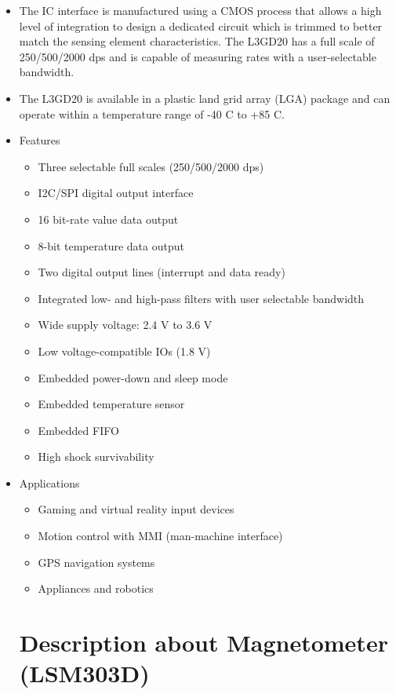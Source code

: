 \documentclass[11pt,a4paper]{article}
\begin{document}
\begin{itemize}
\item The IC interface is manufactured using a CMOS
process that allows a high level of integration to
design a dedicated circuit which is trimmed to
better match the sensing element characteristics.
The L3GD20 has a full scale of 250/500/2000
dps and is capable of measuring rates with a
user-selectable bandwidth.

\item The L3GD20 is available in a plastic land grid
array (LGA) package and can operate within a
temperature range of -40 C to +85 C.

\item Features 
\begin{itemize}
\item Three selectable full scales (250/500/2000
dps)
\item I2C/SPI digital output interface
\item 16 bit-rate value data output
\item 8-bit temperature data output
\item Two digital output lines (interrupt and data
ready)
\item Integrated low- and high-pass filters with user selectable
bandwidth
\item Wide supply voltage: 2.4 V to 3.6 V
\item Low voltage-compatible IOs (1.8 V)
\item Embedded power-down and sleep mode
\item Embedded temperature sensor
\item Embedded FIFO
\item High shock survivability

\end{itemize}

\item Applications
\begin{itemize}
\item Gaming and virtual reality input devices
\item Motion control with MMI (man-machine
interface)
\item GPS navigation systems
\item Appliances and robotics
\end{itemize}


\newpage
\section{Description about Magnetometer (LSM303D)}



\end{itemize}
\end{document}
